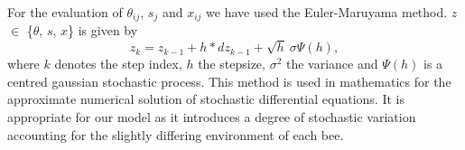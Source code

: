 For the evaluation of $\theta_{ij}$, $s_{j}$ and $x_{ij}$ we have used the Euler-Maruyama method. $z$ $\in$ \{$\theta$, $s$, $x$\} is given by
\begin{equation}
z_{k}=z_{k-1} + h*dz_{k-1}+\sqrt{h}\ \sigma \Psi(h),
\end{equation} 
where $k$ denotes the step index, $h$ the stepsize, $\sigma^{2}$ the variance and $\Psi(h)$ is a centred gaussian stochastic process. This method is used in mathematics for the approximate numerical solution of stochastic differential equations. It is appropriate for our model as it introduces a degree of stochastic variation accounting for the slightly differing environment of each bee.

